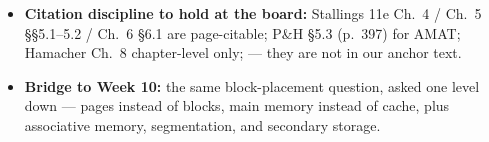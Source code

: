 \documentclass[11pt]{article}
\begin{document}
\begin{itemize}
  \item \textbf{Citation discipline to hold at the board:} Stallings 11e Ch.~4 / Ch.~5 \S\S5.1--5.2 / Ch.~6 \S6.1 are page-citable; P\&H \S5.3 (p.~397) for AMAT; Hamacher Ch.~8 chapter-level only;  --- they are not in our anchor text.
  \item \textbf{Bridge to Week 10:} the same block-placement question, asked one level down --- pages instead of blocks, main memory instead of cache, plus associative memory, segmentation, and secondary storage.
\end{itemize}
\end{document}
